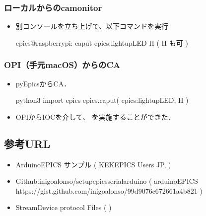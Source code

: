 \documentclass[letterpaper,10pt,dvipdfmx]{sphinxmanual}
\begin{document}
\subsubsection{ローカルからのcamonitor}
\label{\detokenize{epics/rst/example3__arduino_LEDcontrol01:camonitor}}\begin{itemize}
\item {} 
別コンソールを立ち上げて、以下コマンドを実行

\begin{sphinxVerbatim}[commandchars=\\\{\}]
epics@raspberrypi: \PYGZti{} \PYGZdl{} caput epics:lightupLED \PYGZdq{}H\PYGZdq{}      ( H も可 )
\end{sphinxVerbatim}

\end{itemize}


\subsubsection{OPI（手元macOS）からのCA}
\label{\detokenize{epics/rst/example3__arduino_LEDcontrol01:opi-macos-ca}}\begin{itemize}
\item {} 
pyEpicsからCA．

\begin{sphinxVerbatim}[commandchars=\\\{\}]
\PYGZdl{} python3
\PYGZgt{}\PYGZgt{}\PYGZgt{} import epics
\PYGZgt{}\PYGZgt{}\PYGZgt{} epics.caput( \PYGZdq{}epics:lightupLED\PYGZdq{}, \PYGZdq{}H\PYGZdq{} )
\end{sphinxVerbatim}

\item {} 
OPIからIOCを介して、  を実施することができた．

\end{itemize}


\subsection{参考URL}
\label{\detokenize{epics/rst/example3__arduino_LEDcontrol01:url}}\begin{itemize}
\item {} 
Arduino\sphinxhyphen{}EPICS サンプル ( KEK\sphinxhyphen{}EPICS Users JP,  )

\item {} 
Github:inigoalonso/setup\sphinxhyphen{}epics\sphinxhyphen{}serial\sphinxhyphen{}arduino ( arduino\sphinxhyphen{}EPICS  https://gist.github.com/inigoalonso/99d9076c672661a4b821 )

\item {} 
StreamDevice \sphinxhyphen{}protocol Files\sphinxhyphen{} (  )

\end{itemize}
\end{document}
